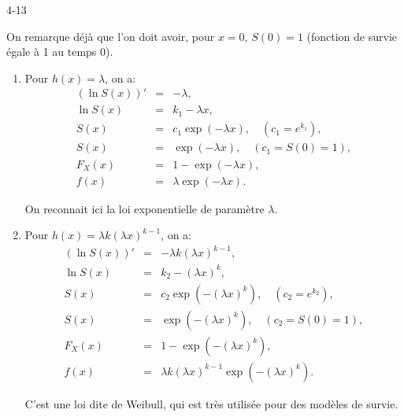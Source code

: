 \begin{corrige}{4-13}

On remarque déjà que l'on doit avoir, pour $x=0$, $S(0)=1$ (fonction de survie égale à 1 au temps 0).

\begin{enumerate}

\item Pour $h(x)=\lambda$, on a:
\begin{eqnarray*}
( \ln S(x) )' &=& -\lambda,\\
\ln S(x) &=& k_1 - \lambda x,\\
S(x) & = & c_1 \exp( -\lambda x ), \quad (c_1 = e^{k_1}),\\
S(x) & = & \exp( -\lambda x ), \quad (c_1 = S(0) = 1),\\
F_X(x) & = & 1 - \exp (-\lambda x ),\\
f(x) & = & \lambda \exp (-\lambda x ).
\end{eqnarray*}

On reconnait ici la loi exponentielle de paramètre $\lambda$.

\item Pour $h(x)=\lambda k (\lambda x)^{k-1}$, on a:
\begin{eqnarray*}
( \ln S(x) )' &=& -\lambda k (\lambda x)^{k-1},\\
\ln S(x) &=& k_2 - (\lambda x)^k,\\
S(x) & = & c_2 \exp( - (\lambda x)^k ), \quad (c_2 = e^{k_2}),\\
S(x) & = & \exp( -(\lambda x)^k ), \quad (c_2 = S(0) = 1),\\
F_X(x) & = & 1 - \exp (-(\lambda x)^k ),\\
f(x) & = & \lambda k (\lambda x)^{k-1}\exp (-(\lambda x)^k ).
\end{eqnarray*}

C'est une loi dite de Weibull, qui est très utilisée pour des modèles de survie.

\end{enumerate}

\end{corrige}
